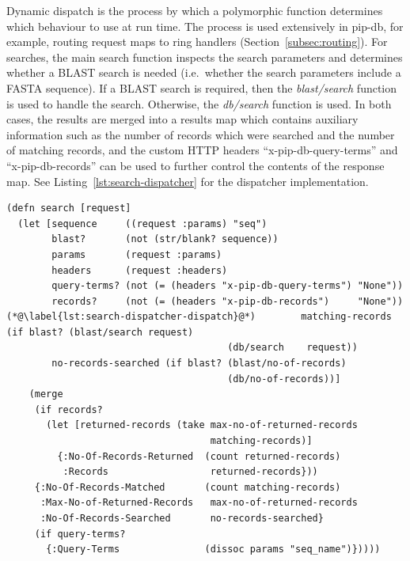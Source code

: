 Dynamic dispatch is the process by which a polymorphic function
determines which behaviour to use at run time. The process is used
extensively in pip-db, for example, routing request maps to ring
handlers (Section~\ref{subsec:routing}). For searches, the main search
function inspects the search parameters and determines whether a BLAST
search is needed (i.e.\ whether the search parameters include a FASTA
sequence). If a BLAST search is required, then the
\textit{blast/search} function is used to handle the
search. Otherwise, the \textit{db/search} function is used. In both
cases, the results are merged into a results map which contains
auxiliary information such as the number of records which were
searched and the number of matching records, and the custom HTTP
headers ``x-pip-db-query-terms'' and ``x-pip-db-records'' can be used
to further control the contents of the response map. See
Listing~\ref{lst:search-dispatcher} for the dispatcher implementation.

\newpage

\lstset{language=clojure}
\begin{lstlisting}[label=lst:search-dispatcher,caption={%
      [Search handler and dynamic dispatcher]
      Search handler and dynamic dispatcher. Accepting a request map,
      the search handler dispatches the appropriate search function
      (line \ref{lst:search-dispatcher-dispatch}), wrapping the
      results into a response map.}]
(defn search [request]
  (let [sequence     ((request :params) "seq")
        blast?       (not (str/blank? sequence))
        params       (request :params)
        headers      (request :headers)
        query-terms? (not (= (headers "x-pip-db-query-terms") "None"))
        records?     (not (= (headers "x-pip-db-records")     "None"))
(*@\label{lst:search-dispatcher-dispatch}@*)        matching-records    (if blast? (blast/search request)
                                       (db/search    request))
        no-records-searched (if blast? (blast/no-of-records)
                                       (db/no-of-records))]
    (merge
     (if records?
       (let [returned-records (take max-no-of-returned-records
                                    matching-records)]
         {:No-Of-Records-Returned  (count returned-records)
          :Records                  returned-records}))
     {:No-Of-Records-Matched       (count matching-records)
      :Max-No-of-Returned-Records   max-no-of-returned-records
      :No-Of-Records-Searched       no-records-searched}
     (if query-terms?
       {:Query-Terms               (dissoc params "seq_name")}))))
\end{lstlisting}



